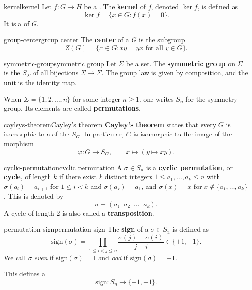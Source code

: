 \begin{topic}{kernel}{kernel}
    Let $f : G \to H$ be a . The \textbf{kernel} of $f$, denoted $\ker f$, is defined as
    \[ \ker f = \{ x \in G : f(x) = 0 \} . \]
    It is a   of $G$.
\end{topic}

\begin{topic}{group-center}{group center}
    The \textbf{center} of a  $G$ is the subgroup
    \[ Z(G) = \{ x \in G : xy = yx \text{ for all } y \in G \} . \]
\end{topic}

\begin{topic}{symmetric-group}{symmetric group}
    Let $\Sigma$ be a set. The \textbf{symmetric group} on $\Sigma$ is the  $S_\Sigma$ of all bijections $\Sigma \to \Sigma$. The group law is given by composition, and the unit is the identity map.
    
    When $\Sigma = \{ 1, 2, \ldots, n \}$ for some integer $n \ge 1$, one writes $S_n$ for the symmetry group. Its elements are called \textbf{permutations}.
\end{topic}

\begin{topic}{cayleys-theorem}{Cayley's theorem}
    \textbf{Cayley's theorem} states that every  $G$ is isomorphic to a  of the  $S_G$. In particular, $G$ is isomorphic to the image of the morphism
    \[ \varphi : G \to S_G, \qquad x \mapsto (y \mapsto xy) . \]
\end{topic}

\begin{topic}{cyclic-permutation}{cyclic permutation}
    A  $\sigma \in S_n$ is a \textbf{cyclic permutation}, or \textbf{cycle}, of length $k$ if there exist $k$ distinct integers $1 \le a_1, \ldots, a_k \le n$ with $\sigma(a_i) = a_{i + 1}$ for $1 \le i < k$ and $\sigma(a_k) = a_1$, and $\sigma(x) = x$ for $x \not\in \{ a_1, \ldots, a_k \}$. This is denoted by
    \[ \sigma = (a_1 \;\; a_2 \;\; \ldots \;\; a_k) . \]
    A cycle of length $2$ is also called a \textbf{transposition}.
\end{topic}

\begin{topic}{permutation-sign}{permutation sign}
    The \textbf{sign} of a  $\sigma \in S_n$ is defined as
    \[ \text{sign}(\sigma) = \prod_{1 \le i < j \le n} \frac{\sigma(j) - \sigma(i)}{j - i} \in \{ +1, -1 \} . \]
    We call $\sigma$ \textit{even} if $\text{sign}(\sigma) = 1$ and \textit{odd} if $\text{sign}(\sigma) = -1$.
    
    This defines a 
    \[ \text{sign} : S_n \to \{ +1, -1 \} . \]
\end{topic}

